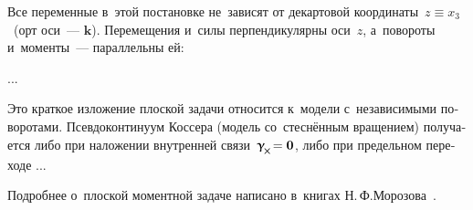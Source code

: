 

\label{para:planedeformation.cosseratcontinuum}

\begin{otherlanguage}{russian}

Все переменные в~этой постановке не~зависят от декартовой координаты~${z \equiv x_3}$~(орт оси~--- $\bm{k}$). Перемещения и~силы перпендикулярны оси~$z$, а~повороты и~моменты~--- параллельны ей:

...


Это краткое изложение плоской задачи относится к~модели с~независимыми поворотами. Псевдоконтинуум Коссера (модель со~стеснённым вращением) получается либо при наложении внутренней связи~${\distortiontensor_{\hspace{-0.25ex}\Xcompanion} \hspace{-0.32ex} = \bm{0}}$, либо при предельном переходе ...

Подробнее о~плоской моментной задаче написано в~книгах Н.\,Ф.\;Морозова~\cite{morozov-twodimensionalproblems, morozov-fractures}.

\end{otherlanguage}



\label{para:nonlinear.micropolar}

